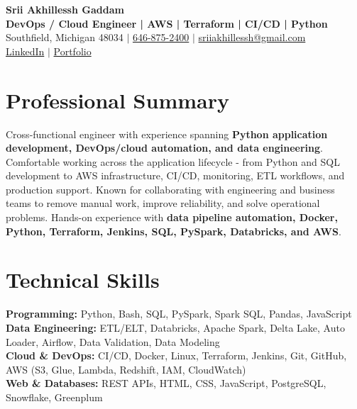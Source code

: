 \documentclass[letterpaper,10pt]{article}
\begin{document}
\fontsize{9.35pt}{10.45pt}\selectfont

\begin{center}
    {\LARGE \textbf{Srii Akhillessh Gaddam}} \\[-1pt]
    \textbf{DevOps / Cloud Engineer | AWS | Terraform | CI/CD | Python} \\[2pt]
    Southfield, Michigan 48034 $|$
    \href{tel:6468752400}{646-875-2400} $|$
    \href{mailto:sriiakhillessh@gmail.com}{sriiakhillessh@gmail.com} \\[1pt]
    \href{https://www.linkedin.com/in/srii-akhiilessh-gaddam-b48668191/}{LinkedIn} $|$
    \href{https://sriiakhillesshg.github.io/portfolio/}{Portfolio}
\end{center}
\vspace{-8pt}

\section{Professional Summary}
\small{Cross-functional engineer with experience spanning \textbf{Python application development, DevOps/cloud automation, and data engineering}. Comfortable working across the application lifecycle - from Python and SQL development to AWS infrastructure, CI/CD, monitoring, ETL workflows, and production support. Known for collaborating with engineering and business teams to remove manual work, improve reliability, and solve operational problems. Hands-on experience with \textbf{data pipeline automation, Docker, Python, Terraform, Jenkins, SQL, PySpark, Databricks, and AWS}.}

\section{Technical Skills}
\small{
\textbf{Programming:} Python, Bash, SQL, PySpark, Spark SQL, Pandas, JavaScript \\
\textbf{Data Engineering:} ETL/ELT, Databricks, Apache Spark, Delta Lake, Auto Loader, Airflow, Data Validation, Data Modeling \\
\textbf{Cloud \& DevOps:} CI/CD, Docker, Linux, Terraform, Jenkins, Git, GitHub, AWS (S3, Glue, Lambda, Redshift, IAM, CloudWatch) \\
\textbf{Web \& Databases:} REST APIs, HTML, CSS, JavaScript, PostgreSQL, Snowflake, Greenplum
}
\end{document}
